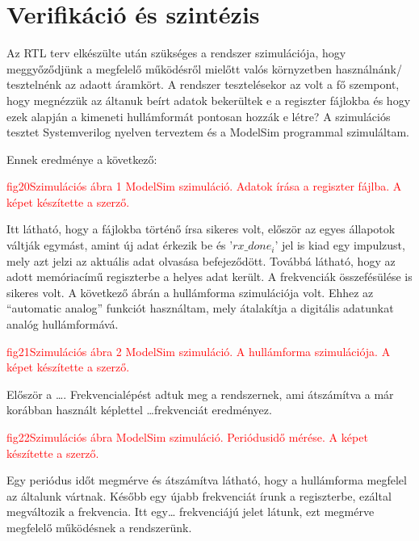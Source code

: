 \documentclass[a4paper,12pt]{article}
\begin{document}
	\section{Verifikáció és szintézis}
	Az RTL terv elkészülte után szükséges a rendszer szimulációja, hogy meggyőződjünk a megfelelő működésről mielőtt valós környzetben használnánk/ tesztelnénk az adaott áramkört.
	A rendszer tesztelésekor az volt a fő szempont, hogy megnézzük az áltanuk beírt adatok bekerültek e a regiszter fájlokba és hogy ezek alapján a kimeneti hullámformát pontosan hozzák e létre?
	A szimulációs tesztet Systemverilog nyelven terveztem és a ModelSim programmal szimuláltam. 

	Ennek eredménye a következő:

	\begin{center}
		\textcolor{red}{
			fig20Szimulációs ábra 1
			ModelSim szimuláció. Adatok írása a regiszter fájlba. A képet készítette a szerző. 
		}
	\end{center}
	Itt látható, hogy a fájlokba történő írsa sikeres volt, először az egyes állapotok váltják egymást, amint új adat érkezik be és '$rx\_done_i$' jel is kiad egy impulzust, mely azt jelzi az aktuális adat olvasása befejeződött. Továbbá látható, hogy az adott memóriacímű regiszterbe a helyes adat került. A frekvenciák összefésülése is sikeres volt.
	A következő ábrán a hullámforma szimulációja volt. Ehhez az “automatic analog” funkciót használtam, mely átalakítja a digitális adatunkat analóg hullámformává.

	\begin{center}
		\textcolor{red}{
		 fig21Szimulációs ábra 2
		 ModelSim szimuláció. A hullámforma szimulációja. A képet készítette a szerző.
		}
	\end{center}
	Először a …. Frekvencialépést adtuk meg a rendszernek, ami átszámítva a már korábban használt képlettel …frekvenciát eredményez. 
	\begin{center}
		\textcolor{red}{
			fig22Szimulációs ábra 
			ModelSim szimuláció. Periódusidő mérése. A képet készítette a szerző.
		}
	\end{center}
	Egy periódus időt megmérve és átszámítva látható, hogy a hullámforma megfelel az általunk vártnak. Később egy újabb frekvenciát írunk a regiszterbe, ezáltal megváltozik a frekvencia. Itt egy… frekvenciájú jelet látunk, ezt megmérve megfelelő működésnek a rendszerünk.  
	
\end{document}

